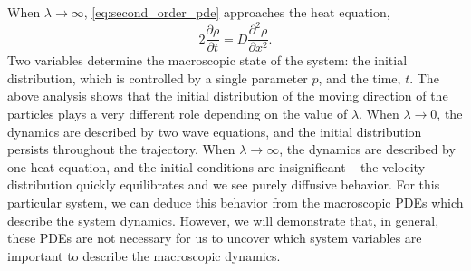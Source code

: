 \documentclass[prl, reprint, final, showkeys]{revtex4-1}
\begin{document}
When $\lambda \rightarrow \infty$, \eqref{eq:second_order_pde} approaches the heat equation,
\begin{equation}
2 \frac{\partial \rho}{\partial t} = D \frac{\partial ^2 \rho}{\partial x^2}.
\end{equation}
%
Two variables determine the macroscopic state of the system: the initial distribution, which is controlled by a single parameter $p$, and the time, $t$.
%
The above analysis shows that the initial distribution of the moving direction of the particles plays a very different role depending on the value of $\lambda$.
%
When $\lambda \rightarrow 0$, the dynamics are described by two wave equations, and the initial distribution persists throughout the trajectory.
%
When $\lambda \rightarrow \infty$, the dynamics are described by one heat equation, and the initial conditions are insignificant -- the velocity distribution quickly equilibrates and we see purely diffusive behavior.
%
For this particular system, we can deduce this behavior from the macroscopic PDEs which describe the system dynamics.
%
However, we will demonstrate that, in general, these PDEs are not necessary for us to uncover which system variables are important to describe the macroscopic dynamics.
\end{document}
